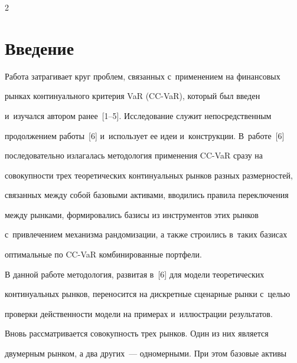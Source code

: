\thispagestyle{headings}





\begin{multicols}{2}





\label{st\stat}


  


   


  \section{Введение}


  


  Работа затрагивает круг проблем, связанных с~применением на финансовых 


рынках континуального критерия VaR (CC-VaR), который был введен 


и~изучался автором ранее~[1--5]. Исследование служит непосредственным 


продолжением работы~[6] и~использует ее идеи и~конструкции. В~работе~[6] 


последовательно излагалась методология применения CC-VaR сразу на 


совокупности трех теоретических континуальных рынков разных размерностей, 


связанных между собой базовыми активами, вводились правила переключения 


между рынками, формировались базисы из инструментов этих рынков 


с~привлечением механизма рандомизации, а также строились в~таких базисах 


оптимальные по CC-VaR комбинированные портфели. 


  


  В данной работе методология, развитая в~[6] для модели теоретических 


континуальных рынков, переносится на дискретные сценарные рынки с~\mbox{целью} 


проверки действенности модели на примерах и~иллюстрации результатов. 


  


  Вновь рассматривается совокупность трех рынков. Один из них является 


двумерным рынком, а два других~--- одномерными. При этом базовые активы 



\end{multicols}

